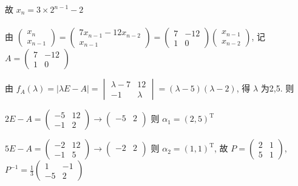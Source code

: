          故 \( x_{n} = 3\times2^{n-1}-2 \)


     \paragraph{} %
         由 \( \begin{pmatrix}
             x_{n} \\
             x_{n-1}
         \end{pmatrix} = \begin{pmatrix}
             7x_{n-1} - 12x_{n-2} \\
             x_{n-1}
         \end{pmatrix} = \begin{pmatrix}
             7 & -12 \\
             1 & 0
         \end{pmatrix}\begin{pmatrix}
             x_{n-1} \\
             x_{n-2}
         \end{pmatrix} \), 记 \( A = \begin{pmatrix}
             7 & -12 \\
             1 & 0
         \end{pmatrix} \)

         由 \( f_{A}(\lambda) = |\lambda E - A| = \begin{vmatrix}
             \lambda-7 & 12      \\
             -1        & \lambda
         \end{vmatrix} = (\lambda-5)(\lambda-2) \), 得 \( \lambda \) 为2,5. 则

         \( 2E-A = \begin{pmatrix}
             -5 & 12 \\
             -1 & 2
         \end{pmatrix} \rightarrow \begin{pmatrix}
             -5 & 2 \\
                &
         \end{pmatrix} \) 则 \( \alpha_{1} = (2,5)^{\mathrm{T}} \)

         \( 5E-A = \begin{pmatrix}
             -2 & 12 \\
             -1 & 5
         \end{pmatrix} \rightarrow \begin{pmatrix}
             -2 & 2 \\
                &
         \end{pmatrix} \) 则 \( \alpha_{2} = (1,1)^{\mathrm{T}} \), 故 \( P = \begin{pmatrix}
             2 & 1 \\
             5 & 1
         \end{pmatrix} \), \( P^{-1} = \frac{1}{3}\begin{pmatrix}
             1  & -1 \\
             -5 & 2
         \end{pmatrix} \)

